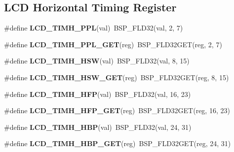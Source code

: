 \subsection*{L\+CD Horizontal Timing Register}
\begin{DoxyCompactItemize}
\item 
\mbox{\label{group__lpc__lcd_ga414901840c90280a6054db07c7076375}} 
\#define {\bfseries L\+C\+D\+\_\+\+T\+I\+M\+H\+\_\+\+P\+PL}(val)~B\+S\+P\+\_\+\+F\+L\+D32(val, 2, 7)
\item 
\mbox{\label{group__lpc__lcd_ga9080bbfdaab1dd23494e89eb5c483bfa}} 
\#define {\bfseries L\+C\+D\+\_\+\+T\+I\+M\+H\+\_\+\+P\+P\+L\+\_\+\+G\+ET}(reg)~B\+S\+P\+\_\+\+F\+L\+D32\+G\+ET(reg, 2, 7)
\item 
\mbox{\label{group__lpc__lcd_ga716e47131a1679740f7a005a5542a71c}} 
\#define {\bfseries L\+C\+D\+\_\+\+T\+I\+M\+H\+\_\+\+H\+SW}(val)~B\+S\+P\+\_\+\+F\+L\+D32(val, 8, 15)
\item 
\mbox{\label{group__lpc__lcd_ga90dd535818f7cd368531605a6696a0e5}} 
\#define {\bfseries L\+C\+D\+\_\+\+T\+I\+M\+H\+\_\+\+H\+S\+W\+\_\+\+G\+ET}(reg)~B\+S\+P\+\_\+\+F\+L\+D32\+G\+ET(reg, 8, 15)
\item 
\mbox{\label{group__lpc__lcd_ga890eae4bfc1709029b30a2b1e9ebf006}} 
\#define {\bfseries L\+C\+D\+\_\+\+T\+I\+M\+H\+\_\+\+H\+FP}(val)~B\+S\+P\+\_\+\+F\+L\+D32(val, 16, 23)
\item 
\mbox{\label{group__lpc__lcd_ga02e3bf34277825981a736cd1efab2979}} 
\#define {\bfseries L\+C\+D\+\_\+\+T\+I\+M\+H\+\_\+\+H\+F\+P\+\_\+\+G\+ET}(reg)~B\+S\+P\+\_\+\+F\+L\+D32\+G\+ET(reg, 16, 23)
\item 
\mbox{\label{group__lpc__lcd_ga690f6144554f282215b4b187617fedaf}} 
\#define {\bfseries L\+C\+D\+\_\+\+T\+I\+M\+H\+\_\+\+H\+BP}(val)~B\+S\+P\+\_\+\+F\+L\+D32(val, 24, 31)
\item 
\mbox{\label{group__lpc__lcd_gac802e05d9eaeed6f6c8dcd5579e46887}} 
\#define {\bfseries L\+C\+D\+\_\+\+T\+I\+M\+H\+\_\+\+H\+B\+P\+\_\+\+G\+ET}(reg)~B\+S\+P\+\_\+\+F\+L\+D32\+G\+ET(reg, 24, 31)
\end{DoxyCompactItemize}
